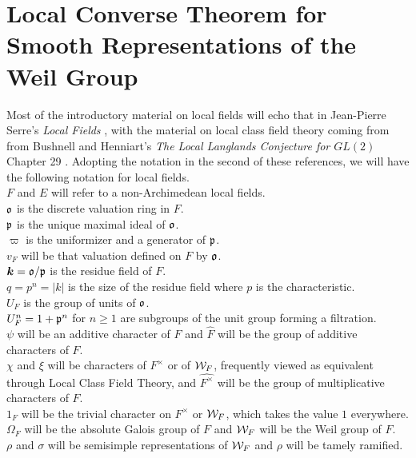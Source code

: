 \chapter{Local Converse Theorem for Smooth Representations of the Weil Group}	%

Most of the introductory material on local fields will echo that in Jean-Pierre Serre's \textit{Local Fields} \cite{Serre1979}, with the material on local class field theory coming from from Bushnell and Henniart's \textit{The Local Langlands Conjecture for $GL(2)$} Chapter 29 \cite{Bushnell2006}.
Adopting the notation in the second of these references, we will have the following notation for local fields.\\
$F$ and $E$ will refer to a non-Archimedean local fields.\\
$\mathfrak{o}$ is the discrete valuation ring in $F$.\\
$\mathfrak{p}$ is the unique maximal ideal of $\mathfrak{o}$.\\
$\varpi$ is the uniformizer and a generator of $\mathfrak{p}$.\\
$v_F$ will be that valuation defined on $F$ by $\mathfrak{o}$.\\
$\bm{k} = \mathfrak{o}/\mathfrak{p}$ is the residue field of $F$.\\
$q = p^n = |k|$ is the size of the residue field where $p$ is the characteristic.\\
$U_F$ is the group of units of $\mathfrak{o}$.\\
$U_F^n = 1 + \mathfrak{p}^n$ for $n \geq 1$ are subgroups of the unit group forming a filtration.\\
$\psi$ will be an additive character of $F$ and $\widehat{F}$ will be the group of additive characters of $F$. \\
$\chi$ and $\xi$ will be characters of $F^\times$ or of $\mathcal{W}_F$, frequently viewed as equivalent through Local Class Field Theory, and $\widehat{F^\times}$ will be the group of multiplicative characters of $F$. \\
$1_F$ will be the trivial character on $F^\times$ or $\mathcal{W}_F$, which takes the value $1$ everywhere.
$\Omega_F$ will be the absolute Galois group of $F$ and $\mathcal{W}_F$ will be the Weil group of $F$. \\
$\rho$ and $\sigma$ will be semisimple representations of $\mathcal{W}_F$ and $\rho$ will be tamely ramified.\\


